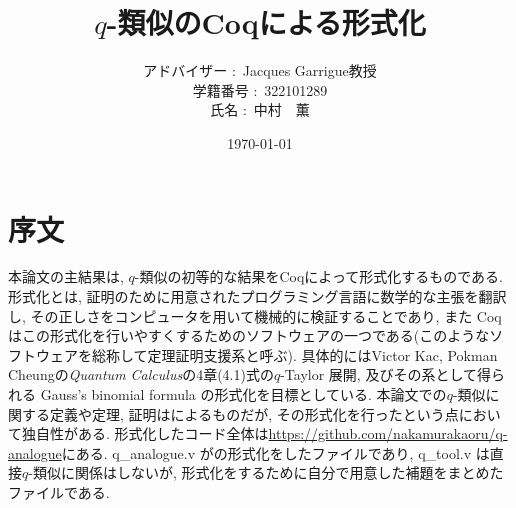 \documentclass[11pt]{jsreport}
\theoremstyle{mystyle}
\newcommand{\0}{\textbf{0}}
\begin{document}
\title{$q$-類似のCoqによる形式化}
\author{アドバイザー $\colon$ Jacques Garrigue教授\\
           学籍番号 $\colon$ 322101289\\
           氏名 $\colon$ 中村　薫}
\date{\today}
\maketitle
\tableofcontents
\section*{序文}
本論文の主結果は, $q$-類似の初等的な結果をCoqによって形式化するものである. 
形式化とは, 証明のために用意されたプログラミング言語に数学的な主張を翻訳し, その正しさをコンピュータを用いて機械的に検証することであり,  また Coq はこの形式化を行いやすくするためのソフトウェアの一つである(このようなソフトウェアを総称して定理証明支援系と呼ぶ).
具体的にはVictor Kac, Pokman Cheungの{\it Quantum Calculus}\cite{Kac}の4章(4.1)式の$q$-Taylor 展開, 及びその系として得られる Gauss's binomial formula の形式化を目標としている. 
本論文での$q$-類似に関する定義や定理, 証明は\cite{Kac}によるものだが, その形式化を行ったという点において独自性がある. 形式化したコード全体は\url{https://github.com/nakamurakaoru/q-analogue}\cite{coq qana}にある. q\_analogue.v が\cite{Kac}の形式化をしたファイルであり, q\_tool.v は直接$q$-類似に関係はしないが, 形式化をするために自分で用意した補題をまとめたファイルである. 
\end{document}
